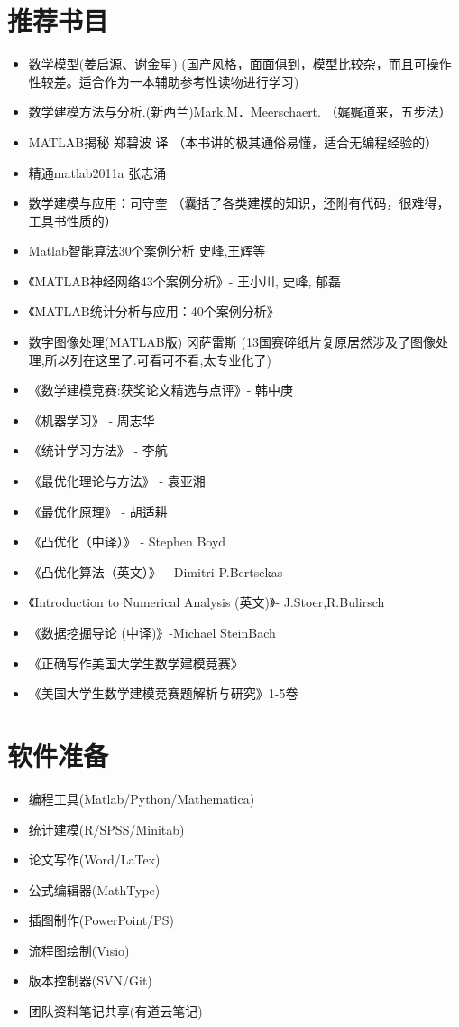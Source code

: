 \documentclass[11pt, a4paper, UTF8]{ctexart}
\begin{document}
\section{推荐书目}
\begin{itemize}
\item 数学模型(姜启源、谢金星) (国产风格，面面俱到，模型比较杂，而且可操作性较差。适合作为一本辅助参考性读物进行学习)
\item 数学建模方法与分析.(新西兰)Mark.M．Meerschaert. （娓娓道来，五步法）
\item MATLAB揭秘  郑碧波 译 （本书讲的极其通俗易懂，适合无编程经验的）
\item 精通matlab2011a  张志涌
\item 数学建模与应用：司守奎 （囊括了各类建模的知识，还附有代码，很难得，工具书性质的）
\item Matlab智能算法30个案例分析  史峰,王辉等
\item 《MATLAB神经网络43个案例分析》- 王小川, 史峰, 郁磊    
\item 《MATLAB统计分析与应用：40个案例分析》
\item 数字图像处理(MATLAB版)  冈萨雷斯 (13国赛碎纸片复原居然涉及了图像处理,所以列在这里了.可看可不看,太专业化了)
\item 《数学建模竞赛:获奖论文精选与点评》- 韩中庚
\item 《机器学习》 - 周志华
\item 《统计学习方法》 - 李航
\item 《最优化理论与方法》 - 袁亚湘
\item 《最优化原理》 - 胡适耕
\item 《凸优化（中译）》 - Stephen Boyd
\item 《凸优化算法（英文）》 - Dimitri P.Bertsekas
\item 《Introduction to Numerical Analysis (英文)》- J.Stoer,R.Bulirsch
\item 《数据挖掘导论 (中译)》-Michael SteinBach
\item 《正确写作美国大学生数学建模竞赛》
\item 《美国大学生数学建模竞赛题解析与研究》1-5卷

\end{itemize}

\section{软件准备}
\begin{itemize}
\item 编程工具(Matlab/Python/Mathematica)
\item 统计建模(R/SPSS/Minitab)
\item 论文写作(Word/LaTex)
\item 公式编辑器(MathType)
\item 插图制作(PowerPoint/PS)
\item 流程图绘制(Visio)
\item 版本控制器(SVN/Git)
\item 团队资料笔记共享(有道云笔记)
\end{itemize}
\end{document}
